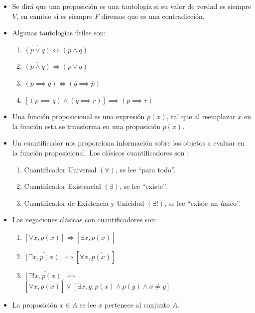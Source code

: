 \documentclass[letterpaper,11pt]{article}
\theoremstyle{plain}
\begin{document}
\begin{framed}
\begin{multicols}{2}
\begin{itemize}
				\item Se dirá que una proposición es una tautología si su valor de verdad es siempre $V$, en cambio si es siempre $F$ diremos que es una contradicción.
				\item Algunas tautologías útiles son:
				\begin{enumerate}
					\item $\overline{(p \vee q)} \iff (\overline{p} \wedge \overline{q})$
					\item $\overline{(p \wedge q)} \iff (\overline{p} \vee \overline{q})$
					\item $(p \implies q) \iff (\overline{q} \implies \overline{p})$
					\item $[(p \implies q)\wedge(q \implies r)]\implies (p \implies r)$
				\end{enumerate}
				\item Una función proposicional es una expresión $p(x)$, tal que al reemplazar $x$ en la función esta se transforma en una proposición $p(x)$.
			
			\item Un cuantificador nos proporciona información sobre los objetos a evaluar en la función proposicional. Los clásicos cuantificadores son :
			\begin{enumerate}
				\item Cuantificador Universal $(\forall)$, se lee ``para todo''.
				\item Cuantificador Existencial $(\exists)$, se lee ``existe''.
				\item Cuantificador de Existencia y Unicidad $(\exists !)$, se lee ``existe un único''.
			\end{enumerate}
			\item Las negaciones clásicas con cuantificadores son:
			\begin{enumerate}
				\item $\overline{[\forall x , p (x)]} \iff [\exists x, \overline{p(x)}]$
				\item $\overline{[\exists x, p(x)]}\iff [\forall x , \overline{p(x)}]$
				\item $\overline{[\exists! x, p(x)]}\iff$ \\ $[\forall x , \overline{p(x)}] \lor [\exists x,y , p(x)\land p(y)\land x\neq y]$
			\end{enumerate}
			
			\item La proposición $x \in A$ se lee $x$ pertenece al conjunto $A$.
			\end{itemize}	
		\end{multicols}
\end{framed}
\end{document}
